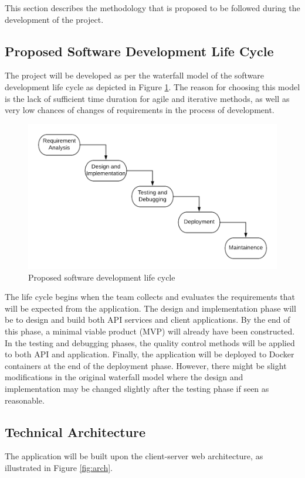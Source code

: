 This section describes the methodology that is proposed to be followed during the development of the project.

\subsection{Proposed Software Development Life Cycle}
The project will be developed as per the waterfall model\cite{waterfall} of the software development life cycle as depicted in Figure \ref{fig:sdlc}. The reason for choosing this model is the lack of sufficient time duration for agile and iterative methods, as well as very low chances of changes of requirements in the process of development. 

\begin{figure}[h]
	\includegraphics[width=\linewidth]{figures/sdlc.png}
	\centering
	\caption{Proposed software development life cycle}
	\label{fig:sdlc}
\end{figure}

The life cycle begins when the team collects and evaluates the requirements that will be expected from the application. The design and implementation phase will be to design and build both API services and client applications. By the end of this phase, a minimal viable product (MVP) will already have been constructed. In the testing and debugging phases, the quality control methods will be applied to both API and application. Finally, the application will be deployed to Docker containers at the end of the deployment phase. However, there might be slight modifications in the original waterfall model where the design and implementation may be changed slightly after the testing phase if seen as reasonable.

\subsection{Technical Architecture}
The application will be built upon the client-server web architecture, as illustrated in Figure \ref{fig:arch}.

